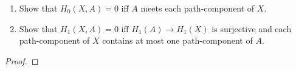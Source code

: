 \begin{problem}[Hatcher {\S}2.1, Ex.\,16]
\begin{enumerate}[label=(\alph*)]
\item Show that $H_0(X,A)=0$ iff $A$ meets each path-component of $X$.
\item Show that $H_1(X,A)=0$ iff $H_1(A)\to H_1(X)$ is surjective and each
  path-component of $X$ contains at most one path-component of $A$.
\end{enumerate}
\end{problem}
\begin{proof}



\end{proof}
